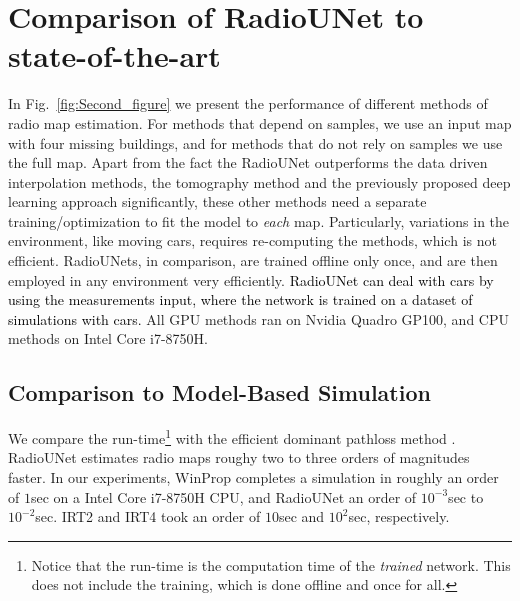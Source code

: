 \documentclass[10pt,a4paper]{article}
\begin{document}

\section{Comparison of RadioUNet to state-of-the-art}

In Fig.~\ref{fig:Second_figure} we present the performance of different methods of radio map estimation. For methods that depend on samples, we use an input map with four missing buildings, and for methods that do not rely on samples we use the full map.
Apart from the fact the RadioUNet outperforms the data driven interpolation methods, the tomography method and the previously proposed deep learning approach significantly, these other methods need a separate training/optimization to fit the model to {\em each} map. Particularly,  variations  in  the  environment, like moving cars,  requires re-computing the methods, which is not efficient. RadioUNets, in comparison, are trained offline only once, and are then employed in any environment very efficiently. 
 \textcolor{black}{RadioUNet can deal with cars by using the measurements input, where the network is trained on a dataset of simulations with cars.}
All GPU methods ran on Nvidia Quadro GP100, and CPU methods on Intel Core i7-8750H.

\subsection{Comparison to Model-Based Simulation}
We compare the run-time\footnote{Notice that the run-time is the computation time of the {\em trained} network. This does not include the training, which is done offline and once for all.} 
with the efficient dominant pathloss method \cite{dominantPathUrban}. RadioUNet estimates radio maps 
roughy two to three orders of magnitudes faster. In our experiments,
WinProp completes a simulation in roughly an order of $1$sec on a Intel Core i7-8750H CPU, and RadioUNet an order of $10^{-3}$sec to $10^{-2}$sec. %
  IRT2 and IRT4 took an order of $10$sec and $10^{2}$sec, respectively.
\end{document}
